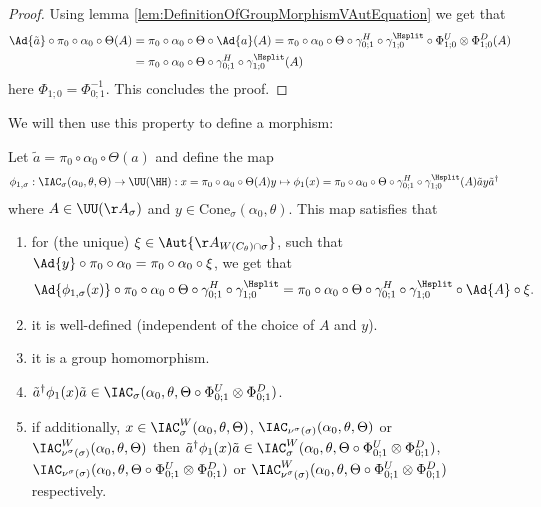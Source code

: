 \begin{proof}
	Using lemma \ref{lem:DefinitionOfGroupMorphismVAutEquation} we get that
	\begin{align}
		\Ad{\tilde{a}}\circ\pi_0\circ\alpha_0\circ\Theta(A)&=\pi_0\circ\alpha_0\circ\Theta\circ\Ad{a}(A)=\pi_0\circ\alpha_0\circ\Theta\circ\gamma^H_{0;1}\circ\gamma^{\Hsplit}_{1;0}\circ\Phi^U_{1;0}\otimes\Phi^D_{1;0}(A)\\
		\nonumber
		&=\pi_0\circ\alpha_0\circ\Theta\circ\gamma^H_{0;1}\circ\gamma^{\Hsplit}_{1;0}(A)
	\end{align}
	here $\Phi_{1;0}=\Phi_{0;1}^{-1}$. This concludes the proof.
\end{proof}
We will then use this property to define a morphism:
\begin{lemma}\label{lem:DefinitionOfGroupMorphism}
	Let $\tilde{a}=\pi_0\circ\alpha_0\circ\Theta(a)$ and define the map
	\begin{align}
		\phi_{1,\sigma}&:\IAC_\sigma(\alpha_0,\theta,\Theta) \rightarrow \UU(\HH):x=\pi_0\circ\alpha_0\circ\Theta(A)y\mapsto \phi_1(x)=\pi_0\circ\alpha_0\circ\Theta\circ\gamma^H_{0;1}\circ\gamma^{\Hsplit}_{1;0}(A)\tilde{a}y\tilde{a}^\dagger
	\end{align}
	where $A\in\UU(\AA_\sigma)$ and $y\in\textrm{Cone}_\sigma(\alpha_0,\theta)$. This map satisfies that
	\begin{enumerate}
		\item  for (the unique) $\xi\in\Aut{\AA_{W(C_\theta)\cap\sigma}}$, such that $\Ad{y}\circ\pi_0\circ\alpha_0=\pi_0\circ\alpha_0\circ\xi$, we get that
		\begin{equation}\label{eq:ConditionDefinitionOfGroupMorphism}
			\Ad{\phi_{1,\sigma}(x)}\circ\pi_0\circ\alpha_0\circ\Theta\circ\gamma^H_{0;1}\circ\gamma^{\Hsplit}_{1;0}=\pi_0\circ\alpha_0\circ\Theta\circ\gamma^H_{0;1}\circ\gamma^{\Hsplit}_{1;0}\circ\Ad{A}\circ\xi.
		\end{equation}
		\item it is well-defined (independent of the choice of $A$ and $y$).
		\item it is a group homomorphism.
		\item $\tilde{a}^\dagger \phi_1(x)\tilde{a}\in\IAC_\sigma(\alpha_0,\theta,\Theta\circ \Phi^U_{0;1}\otimes\Phi^D_{0;1})$.
		\item if additionally, $x\in \IAC_\sigma^W(\alpha_0,\theta,\Theta)$, $\IAC_{\nu^{\sigma}(\sigma)}(\alpha_0,\theta,\Theta)$ or $\IAC_{\nu^{\sigma}(\sigma)}^W (\alpha_0,\theta,\Theta)$ then  $\tilde{a}^\dagger \phi_1(x)\tilde{a}\in\IAC_\sigma^W(\alpha_0,\theta,\Theta\circ \Phi^U_{0;1}\otimes\Phi^D_{0;1})$, $\IAC_{\nu^{\sigma}(\sigma)}(\alpha_0,\theta,\Theta\circ \Phi^U_{0;1}\otimes\Phi^D_{0;1})$ or $\IAC_{\nu^{\sigma}(\sigma)}^W (\alpha_0,\theta,\Theta\circ \Phi^U_{0;1}\otimes\Phi^D_{0;1})$ respectively.
	\end{enumerate}
\end{lemma}
